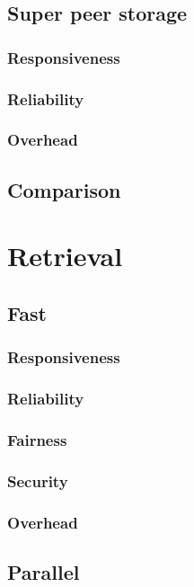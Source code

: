             \subsection{Super peer storage}
                \subsubsection{Responsiveness}
                \subsubsection{Reliability}
                \subsubsection{Overhead}
            \subsection{Comparison}

    \section{Retrieval}
    \label{reliability_compare_retrieval}
            \subsection{Fast}
                \subsubsection{Responsiveness}
                \subsubsection{Reliability}
                \subsubsection{Fairness}
                \subsubsection{Security}
                \subsubsection{Overhead}
            \subsection{Parallel}
